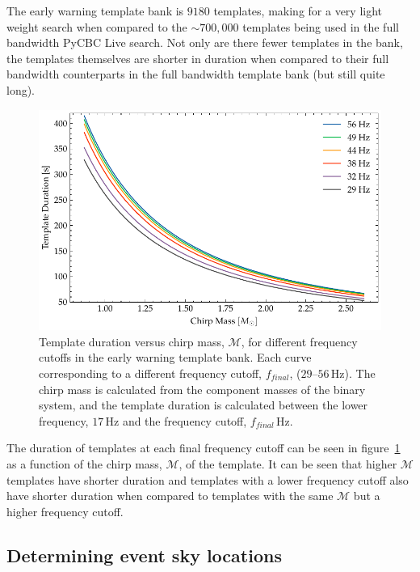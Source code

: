 The early warning template bank is $9180$ templates, making for a very light weight search when compared to the ${\sim}700,000$ templates being used in the full bandwidth PyCBC Live search. Not only are there fewer templates in the bank, the templates themselves are shorter in duration when compared to their full bandwidth counterparts in the full bandwidth template bank (but still quite long).
%
\begin{figure}
    \centering
    \includegraphics[width=\textwidth]{images/6_earlywarning/search/template_bank_duration_mchirp.pdf}
    \caption{Template duration versus chirp mass, $\mathcal{M}$, for different frequency cutoffs in the early warning template bank. Each curve corresponding to a different frequency cutoff, $f_{final}$, ($29\text{--}56  \, \text{Hz}$). The chirp mass is calculated from the component masses of the binary system, and the template duration is calculated between the lower frequency, $17 \, \text{Hz}$ and the frequency cutoff, $f_{final} \, \text{Hz}$.}
    \label{6:fig:tb_duration_mchirp}
\end{figure}
%
The duration of templates at each final frequency cutoff can be seen in figure~\ref{6:fig:tb_duration_mchirp} as a function of the chirp mass, $\mathcal{M}$, of the template. It can be seen that higher $\mathcal{M}$ templates have shorter duration and templates with a lower frequency cutoff also have shorter duration when compared to templates with the same $\mathcal{M}$ but a higher frequency cutoff.

\subsection{\label{6:sec:event-localisation}Determining event sky locations}

